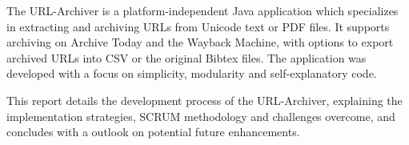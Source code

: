 The URL-Archiver is a platform-independent Java application which specializes in extracting and archiving URLs from Unicode text or PDF files. It supports archiving on Archive Today and the Wayback Machine, with options to export archived URLs into CSV or the original Bibtex files. The application was developed with a focus on simplicity, modularity and self-explanatory code.

This report details the development process of the URL-Archiver, explaining the implementation strategies, SCRUM methodology and challenges overcome, and concludes with a outlook on potential future enhancements.